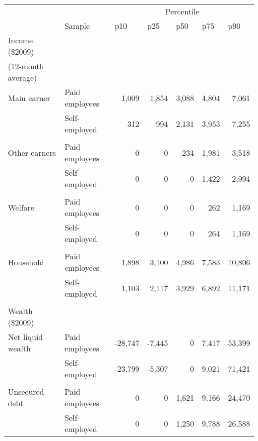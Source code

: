 \begin{tabular}{rlrrrrr}
\toprule
      &       & \multicolumn{5}{c}{Percentile} \\
\cmidrule{3-7}      & Sample & \multicolumn{1}{l}{p10 } & \multicolumn{1}{l}{p25} & \multicolumn{1}{l}{p50} & \multicolumn{1}{l}{p75} & \multicolumn{1}{l}{p90} \\
\midrule
\multicolumn{1}{l}{Income (\$2009)} &       &       &       &       &       &  \\
\multicolumn{1}{l}{(12-month average) } &       &       &       &       &       &  \\
\multicolumn{1}{l}{\qquad Main earner} & Paid employees & 1,009 & 1,854 & 3,088 & 4,804 & 7,061 \\
      & Self-employed & 312   & 994   & 2,131 & 3,953 & 7,255 \\
      &       &       &       &       &       &  \\
\multicolumn{1}{l}{\qquad Other earners} & Paid employees & 0     & 0     & 234   & 1,981 & 3,518 \\
      & Self-employed & 0     & 0     & 0     & 1,422 & 2,994 \\
      &       &       &       &       &       &  \\
\multicolumn{1}{l}{\qquad Welfare} & Paid employees & 0     & 0     & 0     & 262   & 1,169 \\
      & Self-employed & 0     & 0     & 0     & 264   & 1,169 \\
      &       &       &       &       &       &  \\
\multicolumn{1}{l}{\qquad Household} & Paid employees & 1,898 & 3,100 & 4,986 & 7,583 & 10,806 \\
      & Self-employed & 1,103 & 2,117 & 3,929 & 6,892 & 11,171 \\
      &       &       &       &       &       &  \\
\multicolumn{1}{l}{Wealth (\$2009)} &       &       &       &       &       &  \\
\multicolumn{1}{l}{\qquad Net liquid wealth} & Paid employees & -28,747 & -7,445 & 0     & 7,417 & 53,399 \\
      & Self-employed & -23,799 & -5,307 & 0     & 9,021 & 71,421 \\
      &       &       &       &       &       &  \\
\multicolumn{1}{l}{\qquad Unsecured debt} & Paid employees & 0     & 0     & 1,621 & 9,166 & 24,470 \\
      & Self-employed & 0     & 0     & 1,250 & 9,788 & 26,588 \\
\bottomrule
\end{tabular}%
